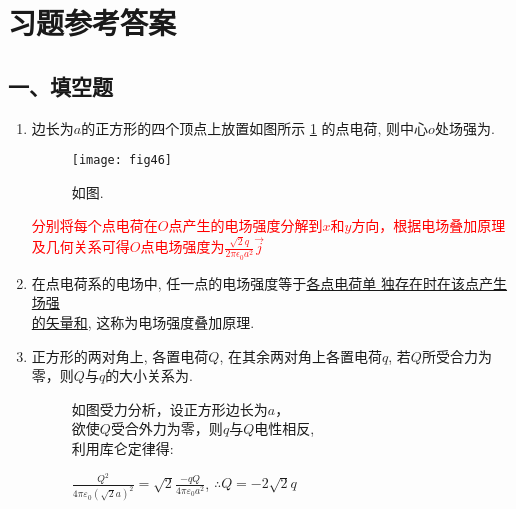 \section{习题参考答案}
\subsection*{一、填空题}
\begin{enumerate}
    \item 边长为$a$的正方形的四个顶点上放置如图所示 \ref{Fig:46} 的点电荷, 则中心$o$处场强为.
    \begin{figure}[H]
        \centering
        \texttt{[image: fig46]}
        \caption{如图.}\label{Fig:46}
    \end{figure}
    \begin{note}
    \textcolor{red}{分别将每个点电荷在$O$点产生的电场强度分解到$x$和$y$方向，根据电场叠加原理及几何关系可得$O$点电场强度为$\frac{\sqrt{2}q}{2\pi \epsilon_0 a^2}\vec{j}$}
    \end{note}
    \item 在点电荷系的电场中, 任一点的电场强度等于\underline{各点电荷单
    独存在时在该点产生场强}\\ \underline{的矢量和}, 这称为电场强度叠加原理.
    \item 正方形的两对角上, 各置电荷$Q$, 在其余两对角上各置电荷$q$, 若$Q$所受合力为零，则$Q$与$q$的大小关系为.
    \begin{note}
        \begin{figure}[H]
            \begin{minipage}[H]{0.6\linewidth}
                \begin{table}[H]
                    \hspace*{1.5cm}如图受力分析，设正方形边长为$a$，\\
                    \hspace*{1.5cm}欲使$Q$受合外力为零，则$q$与$Q$电性相反, \\
                    \hspace*{1.5cm}利用库仑定律得:\par
                    \vspace*{0.1cm}
                    \hspace*{1.5cm}$\frac{Q^2}{4\pi \varepsilon_0 (\sqrt{2}a)^2}=\sqrt{2}\frac{-qQ}{4\pi \varepsilon_0 a^2}$, $\therefore Q=-2\sqrt{2}q$
                \end{table}  
            \end{minipage}

\end{figure}
\end{note}
\end{enumerate}
